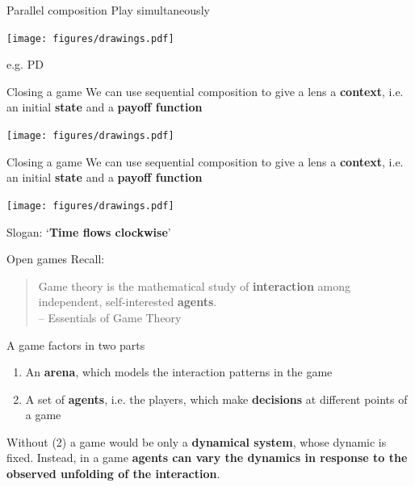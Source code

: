 \begin{frame}{Parallel composition}
	Play simultaneously
	\vfill
	\begin{center}
		\texttt{[image: figures/drawings.pdf]}
	\end{center}
	\vfill
	e.g. PD
\end{frame}

\begin{frame}{Closing a game}
	We can use sequential composition to give a lens a \textbf{context}, i.e. an initial \textbf{state} and a \textbf{payoff function}

	\begin{center}
		\texttt{[image: figures/drawings.pdf]}
	\end{center}

\end{frame}

\begin{frame}{Closing a game}
	We can use sequential composition to give a lens a \textbf{context}, i.e. an initial \textbf{state} and a \textbf{payoff function}

	\begin{center}
		\texttt{[image: figures/drawings.pdf]}
	\end{center}

	Slogan: `\textbf{Time flows clockwise}'
\end{frame}

\begin{frame}{Open games}
	Recall:

	\vfill
	\begin{quotation}
		Game theory is the mathematical study of \textbf{interaction} among independent, self-interested \textbf{agents}.\\
		{\color{colornote}-- Essentials of Game Theory \cite{leyton2008essentials}}
	\end{quotation}

	\vfill
	A game factors in two parts
	\begin{enumerate}
		\item An \textbf{arena}, which models the {interaction patterns} in the game
		\item A set of \textbf{agents}, i.e. the players, which make \textbf{decisions} at different points of a game
	\end{enumerate}

	\vfill
	Without (2) a game would be only a \textbf{dynamical system}, whose dynamic is fixed.
	Instead, in a game \textbf{agents can vary the dynamics in response to the observed unfolding of the interaction}.
\end{frame}

